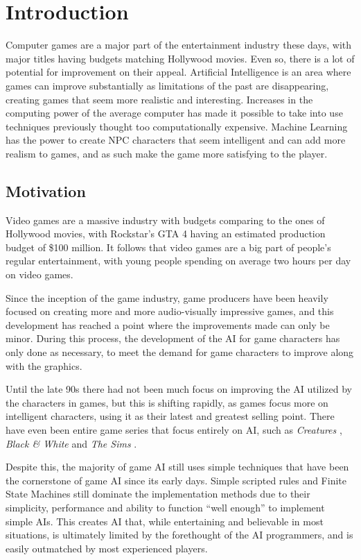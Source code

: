 \cleardoublepage
\chapter{Introduction}
\label{intro} Computer games are a major part of the entertainment industry
these days, with major titles having budgets matching Hollywood movies. Even so,
there is a lot of potential for improvement on their appeal. Artificial
Intelligence is an area where games can improve substantially as limitations of
the past are disappearing, creating games that seem more realistic and
interesting. Increases in the computing power of the average computer has made
it possible to take into use techniques previously thought too computationally
expensive. Machine Learning has the power to create NPC characters that seem
intelligent and can add more realism to games, and as such make the game more
satisfying to the player.

\section{Motivation}
\label{sec:motivation}

Video games are a massive industry with budgets comparing to the ones of
Hollywood movies, with Rockstar's GTA 4 having an estimated production budget of
\$100 million. It follows that video games are a big part of people's regular
entertainment, with young people spending on average two hours per day on video
games. \citep{norway08:video_games}

Since the inception of the game industry, game producers have been heavily
focused on creating more and more audio-visually impressive games, and this
development has reached a point where the improvements made can only be minor.
During this process, the development of the AI for game characters has only done
as necessary, to meet the demand for game characters to improve along with the
graphics. \citep{champandard2003ai}

Until the late 90s there had not been much focus on improving the AI utilized by
the characters in games\citep{tozour2002evolution}, but this is shifting
rapidly, as games focus more on intelligent characters, using it as their latest
and greatest selling point. There have even been entire game series that focus
entirely on AI, such as \emph{Creatures} \citep{grand1997creatures}, \emph{Black
  \& White} \citep{lionhead01:black_white} and \emph{The Sims}
\citep{maxis00:sims}.

Despite this, the majority of game AI still uses simple techniques that have
been the cornerstone of game AI since its early days. Simple scripted rules and
Finite State Machines still dominate the implementation methods due to their
simplicity, performance and ability to function ``well enough'' to implement
simple AIs. \citep{woodcock2001game} This creates AI that, while entertaining
and believable in most situations, is ultimately limited by the forethought of
the AI programmers, and is easily outmatched by most experienced players.

